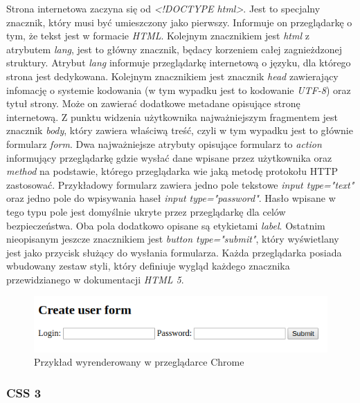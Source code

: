 \documentclass[polish, twoside, 12pt]{mwart}
\begin{document}


Strona internetowa zaczyna się od \emph{<!DOCTYPE html>}. Jest to specjalny znacznik, który musi być umieszczony jako pierwszy. Informuje on przeglądarkę o tym, że tekst jest w formacie \emph{HTML}. Kolejnym znacznikiem jest \emph{html} z atrybutem \emph{lang}, jest to główny znacznik, będacy korzeniem całej zagnieżdzonej struktury. Atrybut \emph{lang} informuje przeglądarkę internetową o języku, dla którego strona jest dedykowana. Kolejnym znacznikiem jest znacznik \emph{head} zawierający infomację o systemie kodowania (w tym wypadku jest to  kodowanie \emph{UTF-8}) oraz tytuł strony. Może on zawierać dodatkowe metadane opisujące stronę internetową. Z punktu widzenia użytkownika najważniejszym fragmentem jest znacznik \emph{body}, który zawiera właściwą treść, czyli w tym wypadku jest to głównie formularz \emph{form}. Dwa najważniejsze atrybuty opisujące formularz to \emph{action} informujący przeglądarkę gdzie wysłać dane wpisane przez użytkownika oraz \emph{method} na podstawie, którego przeglądarka wie jaką metodę protokołu HTTP zastosować. Przykładowy formularz zawiera jedno pole tekstowe \emph{input type="text"} oraz jedno pole do wpisywania haseł \emph{input type="password"}. Hasło wpisane w tego typu pole jest domyślnie ukryte przez przeglądarkę dla celów bezpieczeństwa. Oba pola dodatkowo opisane są etykietami \emph{label}. Ostatnim nieopisanym jeszcze znacznikiem jest \emph{button type="submit"}, który wyświetlany jest jako przycisk służący do wysłania formularza. Każda przeglądarka posiada wbudowany zestaw styli, który definiuje wygląd każdego znacznika przewidzianego w dokumentacji \emph{HTML 5}.

\begin{figure}[ht]
  \includegraphics[width=\textwidth]{html-chrome.png}
	\caption{Przykład wyrenderowany w przeglądarce Chrome}
\end{figure}

\subsubsection{CSS 3}
\end{document}
